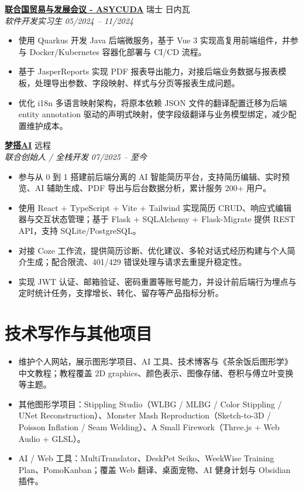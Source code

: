 \documentclass[10pt,fontset=none]{ctexart}
\newcommand{\entry}[4]{
  \textbf{#1} \hfill #2\\
  \textit{#3} \hfill \textit{#4}
}
\begin{document}
\entry{\href{https://asycuda.org/en/}{联合国贸易与发展会议 - ASYCUDA}}{瑞士 日内瓦}{软件开发实习生}{05/2024 -- 11/2024}
\begin{itemize}
  \item 使用 Quarkus 开发 Java 后端微服务，基于 Vue 3 实现高复用前端组件，并参与 Docker/Kubernetes 容器化部署与 CI/CD 流程。
  \item 基于 JasperReports 实现 PDF 报表导出能力，对接后端业务数据与报表模板，处理导出参数、字段映射、样式与分页等报表生成问题。
  \item 优化 i18n 多语言映射架构，将原本依赖 JSON 文件的翻译配置迁移为后端 entity annotation 驱动的声明式映射，使字段级翻译与业务模型绑定，减少配置维护成本。
\end{itemize}

\entry{\href{http://mengdaai.com/}{梦搭AI}}{远程}{联合创始人 / 全栈开发}{07/2025 -- 至今}
\begin{itemize}
  \item 参与从 0 到 1 搭建前后端分离的 AI 智能简历平台，支持简历编辑、实时预览、AI 辅助生成、PDF 导出与后台数据分析，累计服务 200+ 用户。
  \item 使用 React + TypeScript + Vite + Tailwind 实现简历 CRUD、响应式编辑器与交互状态管理；基于 Flask + SQLAlchemy + Flask-Migrate 提供 REST API，支持 SQLite/PostgreSQL。
  \item 对接 Coze 工作流，提供简历诊断、优化建议、多轮对话式经历构建与个人简介生成；配合限流、401/429 错误处理与请求去重提升稳定性。
  \item 实现 JWT 认证、邮箱验证、密码重置等账号能力，并设计前后端行为埋点与定时统计任务，支撑增长、转化、留存等产品指标分析。
\end{itemize}

\section*{技术写作与其他项目}

\begin{itemize}
  \item 维护个人网站，展示图形学项目、AI 工具、技术博客与《茶余饭后图形学》中文教程；教程覆盖 2D graphics、颜色表示、图像存储、卷积与傅立叶变换等主题。
  \item 其他图形学项目：Stippling Studio（WLBG / MLBG / Color Stippling / UNet Reconstruction）、Monster Mash Reproduction（Sketch-to-3D / Poisson Inflation / Seam Welding）、A Small Firework（Three.js + Web Audio + GLSL）。
  \item AI / Web 工具：MultiTranslator、DeskPet Seiko、WeekWise Training Plan、PomoKanban；覆盖 Web 翻译、桌面宠物、AI 健身计划与 Obsidian 插件。
\end{itemize}
\end{document}
